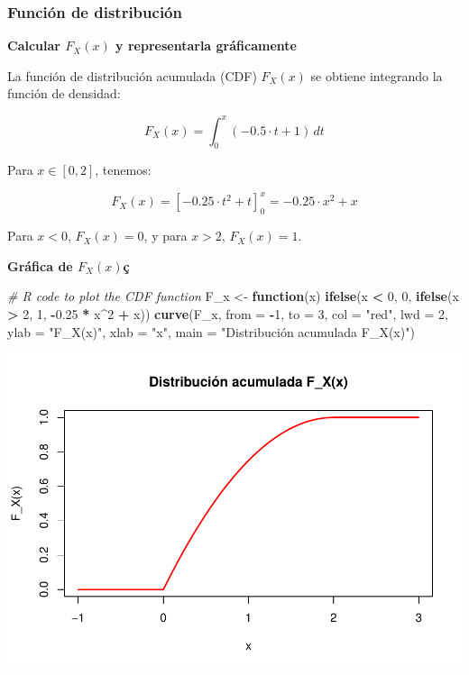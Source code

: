 \documentclass[
]{article}
\newenvironment{Shaded}{\begin{snugshade}}{\end{snugshade}}
\newcommand{\AttributeTok}[1]{\textcolor[rgb]{0.13,0.29,0.53}{#1}}
\newcommand{\CommentTok}[1]{\textcolor[rgb]{0.56,0.35,0.01}{\textit{#1}}}
\newcommand{\ControlFlowTok}[1]{\textcolor[rgb]{0.13,0.29,0.53}{\textbf{#1}}}
\newcommand{\DecValTok}[1]{\textcolor[rgb]{0.00,0.00,0.81}{#1}}
\newcommand{\FloatTok}[1]{\textcolor[rgb]{0.00,0.00,0.81}{#1}}
\newcommand{\FunctionTok}[1]{\textcolor[rgb]{0.13,0.29,0.53}{\textbf{#1}}}
\newcommand{\NormalTok}[1]{#1}
\newcommand{\OtherTok}[1]{\textcolor[rgb]{0.56,0.35,0.01}{#1}}
\newcommand{\SpecialCharTok}[1]{\textcolor[rgb]{0.81,0.36,0.00}{\textbf{#1}}}
\newcommand{\StringTok}[1]{\textcolor[rgb]{0.31,0.60,0.02}{#1}}
\begin{document}
\subsubsection{Función de distribución}\label{funciuxf3n-de-distribuciuxf3n}

\textbf{Calcular \(F_X(x)\) y representarla gráficamente}

La función de distribución acumulada (CDF) \(F_X(x)\) se obtiene integrando la función de densidad:

\[
F_X(x) = \int_0^x (-0.5 \cdot t + 1) \, dt
\]

Para \(x \in [0, 2]\), tenemos:

\[
F_X(x) = \left[-0.25 \cdot t^2 + t\right]_0^x = -0.25 \cdot x^2 + x
\]

Para \(x < 0\), \(F_X(x) = 0\), y para \(x > 2\), \(F_X(x) = 1\).

\textbf{Gráfica de \(F_X(x)\)ç}

\begin{Shaded}
\begin{Highlighting}[]
\CommentTok{\# R code to plot the CDF function}
\NormalTok{F\_x }\OtherTok{\textless{}{-}} \ControlFlowTok{function}\NormalTok{(x) }\FunctionTok{ifelse}\NormalTok{(x }\SpecialCharTok{\textless{}} \DecValTok{0}\NormalTok{, }\DecValTok{0}\NormalTok{, }\FunctionTok{ifelse}\NormalTok{(x }\SpecialCharTok{\textgreater{}} \DecValTok{2}\NormalTok{, }\DecValTok{1}\NormalTok{, }\SpecialCharTok{{-}}\FloatTok{0.25} \SpecialCharTok{*}\NormalTok{ x}\SpecialCharTok{\^{}}\DecValTok{2} \SpecialCharTok{+}\NormalTok{ x))}
\FunctionTok{curve}\NormalTok{(F\_x, }\AttributeTok{from =} \SpecialCharTok{{-}}\DecValTok{1}\NormalTok{, }\AttributeTok{to =} \DecValTok{3}\NormalTok{, }\AttributeTok{col =} \StringTok{"red"}\NormalTok{, }\AttributeTok{lwd =} \DecValTok{2}\NormalTok{, }\AttributeTok{ylab =} \StringTok{"F\_X(x)"}\NormalTok{, }\AttributeTok{xlab =} \StringTok{"x"}\NormalTok{,}
      \AttributeTok{main =} \StringTok{"Distribución acumulada F\_X(x)"}\NormalTok{)}
\end{Highlighting}
\end{Shaded}

\includegraphics{EjerciciosInferenciaEstadistica_files/figure-latex/unnamed-chunk-15-1.pdf}
\end{document}
